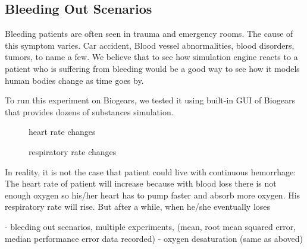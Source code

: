 \documentclass[a4paper]{article}
\begin{document}
\subsection{Bleeding Out Scenarios}

Bleeding patients are often seen in trauma and emergency rooms. The cause of this symptom varies. Car accident, Blood vessel abnormalities, blood disorders, tumors, to name a few. We believe that to see how simulation engine reacts to a patient who is suffering from bleeding would be a good way to see how it models human bodies change as time goes by.

To run this experiment on Biogears, we tested it using built-in GUI of Biogears that provides dozens of substances simulation.  

\begin{figure}[!htb]\centering
   \begin{minipage}{0.49\textwidth}
     \caption{heart rate changes}
     \label{fig:patient bleeding}
     
   \end{minipage}
   \begin {minipage}{0.49\textwidth}
     \caption{respiratory rate changes}
     \label{fig:patient bleeding}
   \end{minipage}
\end{figure}

In reality, it is not the case that patient could live with continuous hemorrhage: The heart rate of patient will increase because with blood loss there is not enough oxygen so his/her heart has to pump faster and absorb more oxygen. His respiratory rate will rise. But after a while, when he/she eventually loses


- bleeding out scenarios, multiple experiments, (mean, root mean squared error, median performance error data recorded)
- oxygen desaturation (same as aboved)
\end{document}
